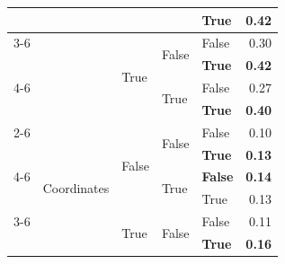 \begin{tabular}{@{}lllllr@{}}
                                                        &                                   &                           &                           & \textbf{True}         & \textbf{0.42} \\
    \cmidrule{3-6}                                      
                                                        &                                   & \multirow[c]{4}{*}{True}  & \multirow[c]{2}{*}{False} & False                 & 0.30 \\
                                                        &                                   &                           &                           & \textbf{True}         & \textbf{0.42} \\
    \cmidrule{4-6}                                      
                                                        &                                   &                           & \multirow[c]{2}{*}{True}  & False                 & 0.27 \\
                                                        &                                   &                           &                           & \textbf{True}         & \textbf{0.40} \\
    \cmidrule{2-6}                                      
                                                        & \multirow[c]{9}{*}{Coordinates}   & \multirow[c]{4}{*}{False} & \multirow[c]{2}{*}{False} & False                 & 0.10 \\
                                                        &                                   &                           &                           & \textbf{True}         & \textbf{0.13} \\
    \cmidrule{4-6}                                      
                                                        &                                   &                           & \multirow[c]{2}{*}{True}  & \textbf{False}        & \textbf{0.14} \\
                                                        &                                   &                           &                           & True                  & 0.13 \\
    \cmidrule{3-6}                                      
                                                        &                                   & \multirow[c]{4}{*}{True}  & \multirow[c]{2}{*}{False} & False                 & 0.11 \\
                                                        &                                   &                           &                           & \textbf{True}         & \textbf{0.16} \\

\end{tabular}
